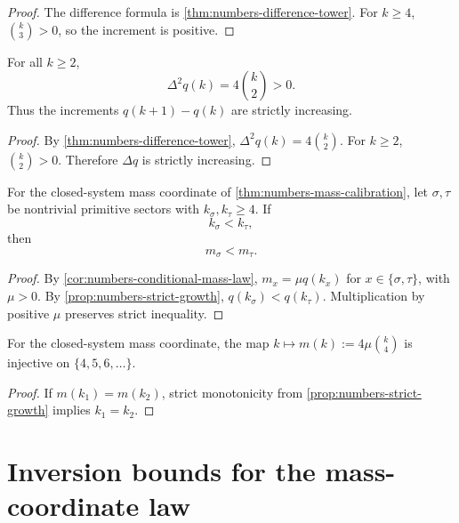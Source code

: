 \begin{proof}
The difference formula is \cref{thm:numbers-difference-tower}.
For \(k\ge4\), \(\binom{k}{3}>0\), so the increment is positive.
\end{proof}

\begin{proposition}
\label{prop:numbers-discrete-convexity}
For all \(k\ge2\),
\[
  \Delta^2 q(k)=4\binom{k}{2}>0.
\]
Thus the increments \(q(k+1)-q(k)\) are strictly increasing.
\end{proposition}

\begin{proof}
By \cref{thm:numbers-difference-tower},
\(
  \Delta^2 q(k)=4\binom{k}{2}
\).
For \(k\ge2\), \(\binom{k}{2}>0\).
Therefore \(\Delta q\) is strictly increasing.
\end{proof}

\begin{theorem}
\label{thm:numbers-depth-order-transfer}
For the closed-system mass coordinate of \cref{thm:numbers-mass-calibration}, let
\(\sigma,\tau\) be nontrivial primitive sectors with
\(k_\sigma,k_\tau\ge4\).
If
\[
  k_\sigma<k_\tau,
\]
then
\[
  m_\sigma<m_\tau.
\]
\end{theorem}

\begin{proof}
By \cref{cor:numbers-conditional-mass-law},
\(
  m_x=\mu q(k_x)
\)
for \(x\in\{\sigma,\tau\}\), with \(\mu>0\).
By \cref{prop:numbers-strict-growth},
\(q(k_\sigma)<q(k_\tau)\).
Multiplication by positive \(\mu\) preserves strict inequality.
\end{proof}

\begin{corollary}
\label{cor:numbers-depth-mass-injective}
For the closed-system mass coordinate, the map
\(
  k\mapsto m(k):=4\mu\binom{k}{4}
\)
is injective on \(\{4,5,6,\dots\}\).
\end{corollary}

\begin{proof}
If \(m(k_1)=m(k_2)\), strict monotonicity from
\cref{prop:numbers-strict-growth} implies \(k_1=k_2\).
\end{proof}

\section{Inversion bounds for the mass-coordinate law}
\label{sec:numbers-inversion}

